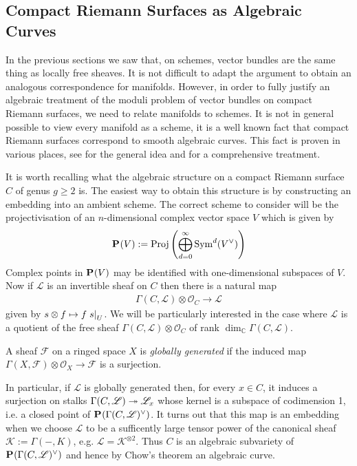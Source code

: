 \documentclass[12pt]{ociamthesis}  %
\begin{document}
\subsection{Compact Riemann Surfaces as Algebraic Curves}
\label{sec:surfaces_as_curves}

In the previous sections we saw that, on schemes, vector bundles are
the same thing as locally free sheaves. It is not difficult to adapt
the argument to obtain an analogous correspondence for manifolds.
However, in order to fully justify an algebraic treatment of the
moduli problem of vector bundles on compact Riemann surfaces, we
need to relate manifolds to schemes. It is not in general possible
to view every manifold as a scheme, it is a well
known fact that compact Riemann surfaces correspond to smooth
algebraic curves.
This fact is proven in various places, see \cite[215]{griffiths1994}
for the general idea and \cite[5-16]{harris2011}
for a comprehensive treatment.

It is worth recalling what the algebraic structure on a compact
Riemann surface $C$ of genus $g\geq 2$ is. The easiest way to obtain
this structure is by constructing an embedding into an ambient
scheme. The correct scheme to consider will be the projectivisation
of an $n$-dimensional complex vector space $V$ which is given
by
\begin{align*}
  \mathbf{P}^{}_{}(V) := \operatorname{Proj}\left({
        \bigoplus_{d=0}^\infty \operatorname{Sym}^d(V^\vee)
      }\right)
\end{align*}
Complex points in $\mathbf{P}^{}_{}(V)$ may be identified
with one-dimensional subspaces of $V$. \missingcitation
Now if $\mathscr L$ is
an invertible sheaf on $C$ then there is a natural map
\begin{align}\label{eq:natural_line_bundle_map}
  \Gamma(C,\mathscr L)\otimes\mathscr O_C \to \mathscr L
\end{align}
given by $s\otimes f \mapsto f\left.{s}\right\vert_{U}$. We will be
particularly interested in the case where $\mathscr L$ is a
quotient of the free sheaf
$\Gamma(C,\mathscr L)\otimes\mathscr O_C$ of rank
$\dim_{\mathbb C} \Gamma(C,\mathscr L)$.

\begin{definition}
  A sheaf $\mathscr F$ on a ringed space $X$ is
  \emph{globally generated} if the induced map
  $\Gamma(X,\mathscr F) \otimes \mathscr O_X \to \mathscr F$
  is a surjection.
\end{definition}

In particular, if $\mathscr L$ is globally generated then, for every $x\in C$,
it induces a surjection on stalks $\Gamma(C,\mathscr L) \twoheadrightarrow \mathscr L_x$
whose kernel is a subspace of codimension 1, i.e. a closed point of
$\mathbf{P}^{}_{}(\Gamma(C,\mathscr L)^\vee)$. It turns out that this map is an
embedding when we choose $\mathscr L$ to be a sufficently large tensor power of
the canonical sheaf $\mathscr K := \Gamma(-,K)$, e.g. $\mathscr L = \mathscr
  K^{\otimes 2}$.  Thus $C$ is an algebraic subvariety of
$\mathbf{P}^{}_{}(\Gamma(C,\mathscr L)^\vee)$ and hence by Chow's
theorem an algebraic curve. 
\end{document}
